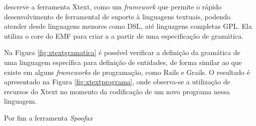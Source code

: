  descreve a ferramenta Xtext, como um \textit{framework} que permite o rápido desenvolvimento de ferramental de suporte à linguagens textuais, podendo atender desde linguagens menores como \gls{DSL}, até linguagens completas \gls{GPL}. Ela utiliza o core do \gls{EMF} para criar a  a partir de uma especificação de gramática. 

Na Figura \ref{fig:xtextgramatica} é possível verificar a definição da gramática de uma linguagem específica para definição de entidades, de forma similar ao que existe em alguns \textit{frameworks} de programação, como Rails e Grails. O resultado é apresentado na Figura \ref{fig:xtextprograma}, onde observa-se a utilização de recursos do Xtext no momento da codificação de um novo programa nessa linguagem.





\newpage
Por fim a ferramenta \textit{Spoofax}
